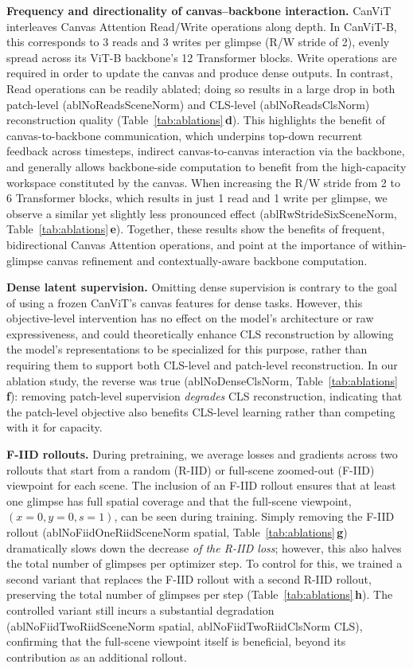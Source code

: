 \documentclass{article}
\newcommand{\abldelta}[2]{\csname abl#1#2\endcsname}
\begin{document}
\textbf{Frequency and directionality of canvas--backbone interaction.}
CanViT interleaves Canvas Attention Read/Write operations along depth.
In CanViT-B, this corresponds to 3 reads and 3 writes per glimpse (R/W stride of 2), evenly spread across its ViT-B backbone's 12 Transformer blocks.
Write operations are required in order to update the canvas and produce dense outputs.
In contrast, Read operations can be readily ablated; doing so results in a large drop in both patch-level (\abldelta{NoReads}{SceneNorm}) and CLS-level (\abldelta{NoReads}{ClsNorm}) reconstruction quality (Table~\ref{tab:ablations}\,\textbf{d}).
This highlights the benefit of canvas-to-backbone communication, which underpins top-down recurrent feedback across timesteps, indirect canvas-to-canvas interaction via the backbone, and generally allows backbone-side computation to benefit from the high-capacity workspace constituted by the canvas.
When increasing the R/W stride from 2 to 6 Transformer blocks, which results in just 1 read and 1 write per glimpse, we observe a similar yet slightly less pronounced effect (\abldelta{RwStrideSix}{SceneNorm}, Table~\ref{tab:ablations}\,\textbf{e}).
Together, these results show the benefits of frequent, bidirectional Canvas Attention operations, and point at the importance of within-glimpse canvas refinement and contextually-aware backbone computation.

\textbf{Dense latent supervision.}
Omitting dense supervision is contrary to the goal of using a frozen CanViT's canvas features for dense tasks.
However, this objective-level intervention has no effect on the model's architecture or raw expressiveness, and could theoretically enhance CLS reconstruction by allowing the model's representations to be specialized for this purpose, rather than requiring them to support both CLS-level and patch-level reconstruction.
In our ablation study, the reverse was true (\abldelta{NoDense}{ClsNorm}, Table~\ref{tab:ablations}\,\textbf{f}): removing patch-level supervision \emph{degrades} CLS reconstruction, indicating that the patch-level objective also benefits CLS-level learning rather than competing with it for capacity.

\textbf{F-IID rollouts.}
During pretraining, we average losses and gradients across two rollouts that start from a random (R-IID) or full-scene zoomed-out (F-IID) viewpoint for each scene.
The inclusion of an F-IID rollout ensures that at least one glimpse has full spatial coverage and that the full-scene viewpoint, $(x = 0, y = 0, s = 1)$, can be seen during training.
Simply removing the F-IID rollout (\abldelta{NoFiidOneRiid}{SceneNorm} spatial, Table~\ref{tab:ablations}\,\textbf{g}) dramatically slows down the decrease \emph{of the R-IID loss}; however, this also halves the total number of glimpses per optimizer step.
To control for this, we trained a second variant that replaces the F-IID rollout with a second R-IID rollout, preserving the total number of glimpses per step (Table~\ref{tab:ablations}\,\textbf{h}).
The controlled variant still incurs a substantial degradation (\abldelta{NoFiidTwoRiid}{SceneNorm} spatial, \abldelta{NoFiidTwoRiid}{ClsNorm} CLS), confirming that the full-scene viewpoint itself is beneficial, beyond its contribution as an additional rollout.
\end{document}
